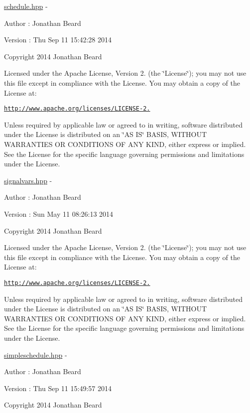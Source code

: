 \hyperlink{schedule_8hpp_source}{schedule.\+hpp} -\/ \begin{DoxyAuthor}{Author}
\+: Jonathan Beard 
\end{DoxyAuthor}
\begin{DoxyVersion}{Version}
\+: Thu Sep 11 15\+:42\+:28 2014
\end{DoxyVersion}
Copyright 2014 Jonathan Beard

Licensed under the Apache License, Version 2. (the \char`\"{}\+License\char`\"{}); you may not use this file except in compliance with the License. You may obtain a copy of the License at\+:

\href{http://www.apache.org/licenses/LICENSE-2.0}{\tt http\+://www.\+apache.\+org/licenses/\+L\+I\+C\+E\+N\+S\+E-\/2.}

Unless required by applicable law or agreed to in writing, software distributed under the License is distributed on an \char`\"{}\+A\+S I\+S\char`\"{} B\+A\+S\+IS, W\+I\+T\+H\+O\+UT W\+A\+R\+R\+A\+N\+T\+I\+ES OR C\+O\+N\+D\+I\+T\+I\+O\+NS OF A\+NY K\+I\+ND, either express or implied. See the License for the specific language governing permissions and limitations under the License.

\hyperlink{signalvars_8hpp_source}{signalvars.\+hpp} -\/ \begin{DoxyAuthor}{Author}
\+: Jonathan Beard 
\end{DoxyAuthor}
\begin{DoxyVersion}{Version}
\+: Sun May 11 08\+:26\+:13 2014
\end{DoxyVersion}
Copyright 2014 Jonathan Beard

Licensed under the Apache License, Version 2. (the \char`\"{}\+License\char`\"{}); you may not use this file except in compliance with the License. You may obtain a copy of the License at\+:

\href{http://www.apache.org/licenses/LICENSE-2.0}{\tt http\+://www.\+apache.\+org/licenses/\+L\+I\+C\+E\+N\+S\+E-\/2.}

Unless required by applicable law or agreed to in writing, software distributed under the License is distributed on an \char`\"{}\+A\+S I\+S\char`\"{} B\+A\+S\+IS, W\+I\+T\+H\+O\+UT W\+A\+R\+R\+A\+N\+T\+I\+ES OR C\+O\+N\+D\+I\+T\+I\+O\+NS OF A\+NY K\+I\+ND, either express or implied. See the License for the specific language governing permissions and limitations under the License.

\hyperlink{simpleschedule_8hpp_source}{simpleschedule.\+hpp} -\/ \begin{DoxyAuthor}{Author}
\+: Jonathan Beard 
\end{DoxyAuthor}
\begin{DoxyVersion}{Version}
\+: Thu Sep 11 15\+:49\+:57 2014
\end{DoxyVersion}
Copyright 2014 Jonathan Beard


